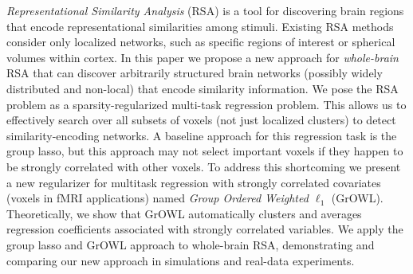 \emph{Representational Similarity Analysis} (RSA) is a tool for discovering brain regions that encode representational similarities among stimuli. Existing RSA methods consider only localized networks, such as specific regions of interest or spherical volumes within cortex.  In this paper we propose a new approach for {\em whole-brain} RSA that can discover arbitrarily structured brain networks (possibly widely distributed and non-local) that encode similarity information.  We pose the RSA problem as a sparsity-regularized multi-task regression problem. This allows us to effectively search over all subsets of voxels (not just localized clusters) to detect similarity-encoding networks.  A baseline approach for this regression task is the group lasso, but this approach may not select important voxels if they happen to be strongly correlated with other voxels.  To address this shortcoming we present a new regularizer for multitask regression with strongly correlated covariates (voxels in fMRI applications) named \emph{Group Ordered Weighted $\ell_1$} (GrOWL).  Theoretically, we show that GrOWL automatically clusters and averages regression coefficients associated with strongly correlated variables. We apply the group lasso and GrOWL approach to whole-brain RSA, demonstrating and comparing our new approach in simulations and real-data experiments.